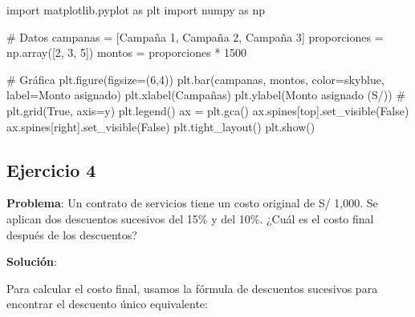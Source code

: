 \documentclass[
  stu,
  floatsintext,
  longtable,
  a4paper,
  nolmodern,
  notxfonts,
  notimes,
  12pt,
  colorlinks=true,linkcolor=blue,citecolor=blue,urlcolor=blue]{apa7}
\newenvironment{Shaded}{\begin{snugshade}}{\end{snugshade}}
\newcommand{\CommentTok}[1]{\textcolor[rgb]{0.37,0.37,0.37}{#1}}
\newcommand{\DecValTok}[1]{\textcolor[rgb]{0.68,0.00,0.00}{#1}}
\newcommand{\ImportTok}[1]{\textcolor[rgb]{0.00,0.46,0.62}{#1}}
\newcommand{\NormalTok}[1]{\textcolor[rgb]{0.00,0.23,0.31}{#1}}
\newcommand{\OperatorTok}[1]{\textcolor[rgb]{0.37,0.37,0.37}{#1}}
\newcommand{\StringTok}[1]{\textcolor[rgb]{0.13,0.47,0.30}{#1}}
\newcommand{\VariableTok}[1]{\textcolor[rgb]{0.07,0.07,0.07}{#1}}
\begin{document}
\begin{Shaded}
\begin{Highlighting}[]
\ImportTok{import}\NormalTok{ matplotlib.pyplot }\ImportTok{as}\NormalTok{ plt}
\ImportTok{import}\NormalTok{ numpy }\ImportTok{as}\NormalTok{ np}

\CommentTok{\# Datos}
\NormalTok{campanas }\OperatorTok{=}\NormalTok{ [}\StringTok{\textquotesingle{}Campaña 1\textquotesingle{}}\NormalTok{, }\StringTok{\textquotesingle{}Campaña 2\textquotesingle{}}\NormalTok{, }\StringTok{\textquotesingle{}Campaña 3\textquotesingle{}}\NormalTok{]}
\NormalTok{proporciones }\OperatorTok{=}\NormalTok{ np.array([}\DecValTok{2}\NormalTok{, }\DecValTok{3}\NormalTok{, }\DecValTok{5}\NormalTok{])}
\NormalTok{montos }\OperatorTok{=}\NormalTok{ proporciones }\OperatorTok{*} \DecValTok{1500}

\CommentTok{\# Gráfica}
\NormalTok{plt.figure(figsize}\OperatorTok{=}\NormalTok{(}\DecValTok{6}\NormalTok{,}\DecValTok{4}\NormalTok{))}
\NormalTok{plt.bar(campanas, montos, color}\OperatorTok{=}\StringTok{\textquotesingle{}skyblue\textquotesingle{}}\NormalTok{, label}\OperatorTok{=}\StringTok{\textquotesingle{}Monto asignado\textquotesingle{}}\NormalTok{)}
\NormalTok{plt.xlabel(}\StringTok{\textquotesingle{}Campañas\textquotesingle{}}\NormalTok{)}
\NormalTok{plt.ylabel(}\StringTok{\textquotesingle{}Monto asignado (S/)\textquotesingle{}}\NormalTok{)}
\CommentTok{\# plt.grid(True, axis=\textquotesingle{}y\textquotesingle{})}
\NormalTok{plt.legend()}
\NormalTok{ax }\OperatorTok{=}\NormalTok{ plt.gca()}
\NormalTok{ax.spines[}\StringTok{\textquotesingle{}top\textquotesingle{}}\NormalTok{].set\_visible(}\VariableTok{False}\NormalTok{)}
\NormalTok{ax.spines[}\StringTok{\textquotesingle{}right\textquotesingle{}}\NormalTok{].set\_visible(}\VariableTok{False}\NormalTok{)}
\NormalTok{plt.tight\_layout()}
\NormalTok{plt.show()}
\end{Highlighting}
\end{Shaded}

\subsection{Ejercicio 4}\label{ejercicio-4}

\textbf{Problema}: Un contrato de servicios tiene un costo original de
S/ 1,000. Se aplican dos descuentos sucesivos del 15\% y del 10\%. ¿Cuál
es el costo final después de los descuentos?

\textbf{Solución}:

Para calcular el costo final, usamos la fórmula de descuentos sucesivos
para encontrar el descuento único equivalente:
\end{document}
